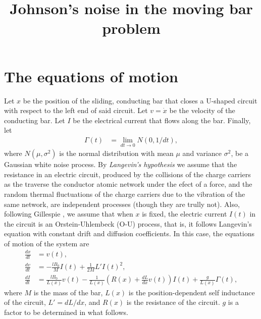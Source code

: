 \documentclass[11pt]{article}
\title{Johnson's noise in the moving bar problem}
\author{}
\date{}
\begin{document}
\maketitle


\section{The equations of motion}
Let $x$ be the position of the sliding, conducting bar that closes a U-shaped circuit with respect to the left end of said circuit. Let $v=\dot{x}$ be the velocity of the conducting bar. Let $I$ be the electrical current that flows along the bar. Finally, let
\begin{align}
  \Gamma(t)&=\lim_{dt\rightarrow0}N(0,1/dt),
\end{align}
where $N(\mu,\sigma^2)$ is the normal distribution with mean $\mu$ and variance $\sigma^2$, be a Gaussian white noise process. By {\it Langevin's hypothesis} we assume that the resistance in an electric circuit, produced by the collisions of the charge carriers as the traverse the conductor atomic network under the efect of a force,  and the random thermal fluctuations of the charge carriers due to the vibration of the same network, are independent processes (though they are trully not). Also, following Gillespie \cite{gillespie}, we assume that when $x$ is fixed, the electric current $I(t)$ in the circuit is an Orstein-Uhlembeck (O-U) process, that is, it follows Langevin's equation with constant drift and diffusion coefficients. In this case,
the equations of motion of the system are
\begin{align}
  \frac{dx}{dt}&=v(t),\\
  \frac{dv}{dt}&=-\frac{lB_0}{M}I(t)+\frac{1}{2M}L'I(t)^2,\\
  \frac{dI}{dt}&=\frac{lB_0}{L(x)}v(t)-\frac{1}{L(x)}\left(R(x)+\frac{dL}{dx}v(t)\right)I(t)+\frac{g}{L(x)}\Gamma(t),
\end{align}
where $M$ is the mass of the bar, $L(x)$ is the position-dependent self inductance of the circuit, $L'=dL/dx$, and $R(x)$ is the resistance of the circuit. $g$ is a factor to be determined in what follows.\\
\end{document}
